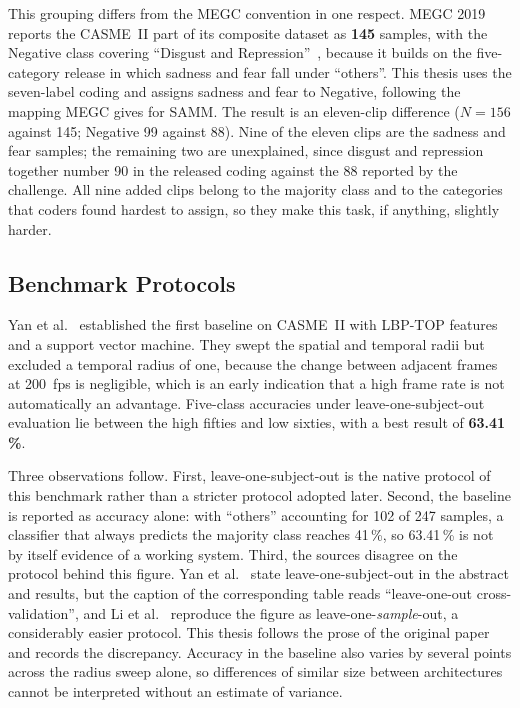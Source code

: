 This grouping differs from the MEGC convention in one respect. MEGC 2019 reports the CASME~II part of its composite dataset as \textbf{145} samples, with the Negative class covering ``Disgust and Repression''~\cite{see2019}, because it builds on the five-category release in which sadness and fear fall under ``others''. This thesis uses the seven-label coding and assigns sadness and fear to Negative, following the mapping MEGC gives for SAMM. The result is an eleven-clip difference ($N = 156$ against 145; Negative 99 against 88). Nine of the eleven clips are the sadness and fear samples; the remaining two are unexplained, since disgust and repression together number 90 in the released coding against the 88 reported by the challenge. All nine added clips belong to the majority class and to the categories that coders found hardest to assign, so they make this task, if anything, slightly harder.

\subsection{Benchmark Protocols}
\label{sec:original-baseline}
\label{sec:megc-metrics}

Yan et al.~\cite{yan2014} established the first baseline on CASME~II with LBP-TOP features~\cite{zhaoG2007} and a support vector machine. They swept the spatial and temporal radii but excluded a temporal radius of one, because the change between adjacent frames at 200~fps is negligible, which is an early indication that a high frame rate is not automatically an advantage. Five-class accuracies under leave-one-subject-out evaluation lie between the high fifties and low sixties, with a best result of \textbf{63.41\,\%}.

Three observations follow. First, leave-one-subject-out is the native protocol of this benchmark rather than a stricter protocol adopted later. Second, the baseline is reported as accuracy alone: with ``others'' accounting for 102 of 247 samples, a classifier that always predicts the majority class reaches 41\,\%, so 63.41\,\% is not by itself evidence of a working system. Third, the sources disagree on the protocol behind this figure. Yan et al.~\cite{yan2014} state leave-one-subject-out in the abstract and results, but the caption of the corresponding table reads ``leave-one-out cross-validation'', and Li et al.~\cite{liX2018} reproduce the figure as leave-one-\textit{sample}-out, a considerably easier protocol. This thesis follows the prose of the original paper and records the discrepancy. Accuracy in the baseline also varies by several points across the radius sweep alone, so differences of similar size between architectures cannot be interpreted without an estimate of variance.

